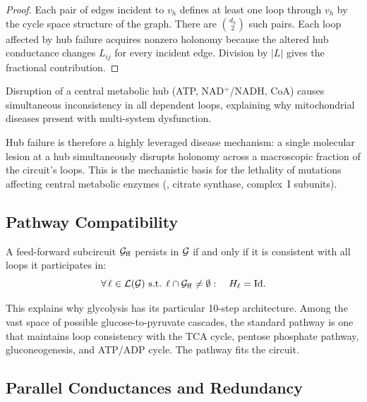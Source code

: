 \begin{proof}
Each pair of edges incident to $v_h$ defines at least one loop through
$v_h$ by the cycle space structure of the graph.  There are $\binom{d_h}{2}$
such pairs.  Each loop affected by hub failure acquires nonzero holonomy
because the altered hub conductance changes $L_{ij}$ for every incident
edge.  Division by $|L|$ gives the fractional contribution.
\end{proof}

\begin{corollary}
\label{cor:multisystem}
Disruption of a central metabolic hub (ATP, NAD$^+$/NADH, CoA) causes
simultaneous inconsistency in all dependent loops, explaining why
mitochondrial diseases present with multi-system dysfunction.
\end{corollary}

Hub failure is therefore a highly leveraged disease mechanism: a single
molecular lesion at a hub simultaneously disrupts holonomy across a
macroscopic fraction of the circuit's loops.  This is the mechanistic
basis for the lethality of mutations affecting central metabolic enzymes
(\eg, citrate synthase, complex~I subunits).

\subsection{Pathway Compatibility}

\begin{theorem}
\label{thm:pathway-compatibility}
A feed-forward subcircuit $\mathcal{G}_{\mathrm{ff}}$ persists in $\mathcal{G}$ if
and only if it is consistent with all loops it participates in:
\begin{equation}
  \forall\, \ell \in \mathcal{L}(\mathcal{G})
  \text{ s.t. } \ell \cap \mathcal{G}_{\mathrm{ff}} \neq \emptyset:
  \quad H_\ell = \mathrm{Id}.
\end{equation}
\end{theorem}

This explains why glycolysis has its particular 10-step architecture.
Among the vast space of possible glucose-to-pyruvate cascades, the
standard pathway is one that maintains loop consistency with the TCA
cycle, pentose phosphate pathway, gluconeogenesis, and ATP/ADP cycle.
The pathway fits the circuit.

\subsection{Parallel Conductances and Redundancy}

